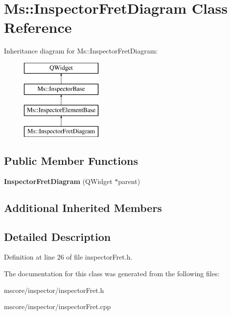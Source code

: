 \hypertarget{class_ms_1_1_inspector_fret_diagram}{}\section{Ms\+:\+:Inspector\+Fret\+Diagram Class Reference}
\label{class_ms_1_1_inspector_fret_diagram}
Inheritance diagram for Ms\+:\+:Inspector\+Fret\+Diagram\+:\begin{figure}[H]
\begin{center}
\leavevmode
\includegraphics[height=4.000000cm]{class_ms_1_1_inspector_fret_diagram}
\end{center}
\end{figure}
\subsection*{Public Member Functions}
\begin{DoxyCompactItemize}
\item 
\mbox{\label{class_ms_1_1_inspector_fret_diagram_a41cc4866680be99489d33b11bbd7e983}} 
{\bfseries Inspector\+Fret\+Diagram} (Q\+Widget $\ast$parent)
\end{DoxyCompactItemize}
\subsection*{Additional Inherited Members}


\subsection{Detailed Description}


Definition at line 26 of file inspector\+Fret.\+h.



The documentation for this class was generated from the following files\+:\begin{DoxyCompactItemize}
\item 
mscore/inspector/inspector\+Fret.\+h\item 
mscore/inspector/inspector\+Fret.\+cpp\end{DoxyCompactItemize}
